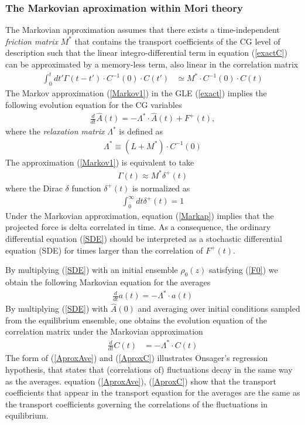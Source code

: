 \documentclass[b5paper,openright,10pt]{book}
\newcommand{\esc}{\!\cdot\!}
\begin{document}
\subsubsection{The Markovian aproximation within Mori theory}
\label{Sec:Markov}
The   Markovian   approximation   assumes    that   there   exists   a
time-independent \textit{friction matrix} $M^*$ that
  contains the transport  coefficients of the CG  level of description
such that  the linear integro-differential term  in equation (\ref{exactC})
can  be  approximated  by  a  memory-less term,  also  linear  in  the
correlation matrix
\begin{align}
\int_0^tdt' \Gamma(t-t')\esc C^{-1}(0)\esc  C(t')&\simeq M^*\esc C^{-1}(0)\esc C(t)
\label{Markov1}
\end{align}
The  Markov approximation  (\ref{Markov1})  in  the GLE  (\ref{exact})
implies the following evolution equation for the CG variables
\begin{align}
  \frac{d}{dt}\hat{A}(t) = -\Lambda^*\esc \hat{A} (t) +F^+(t),
\label{SDE}
\end{align}
where the \textit{relaxation matrix} $\Lambda^*$ is defined as
\begin{align}
\Lambda^*\equiv(L+M^*)\esc C^{-1}(0)  
\label{Lambda}
\end{align}
The   approximation
(\ref{Markov1}) is equivalent to take
\begin{align}
  \Gamma(t) \approx M^*\delta^+(t)
\label{Markap}
\end{align}
where   the Dirac $\delta$ function
$\delta^+(t)$ is normalized as
\begin{align}
  \int_0^\infty dt \delta^+(t) =1
\end{align}
Under the  Markovian approximation,  equation  (\ref{Markap})  implies that
the projected  force is delta correlated  in time. As a  consequence, the
ordinary differential equation (\ref{SDE}) should be interpreted as a
stochastic  differential  equation (SDE)  for  times  larger than  the
correlation of $F^+(t)$.

By multiplying (\ref{SDE}) with an initial ensemble $\rho_0(z)$
satisfying (\ref{F0})
we obtain the following Markovian equation for the averages
\begin{align}
  \frac{d}{dt}a(t) = -\Lambda^*\esc a(t)
\label{AproxAve}
\end{align}
By  multiplying  (\ref{SDE})  with $\hat{A}(0)$  and  averaging  over
initial conditions sampled from  the equilibrium ensemble, one obtains
the evolution  equation of the  correlation matrix  under the
Markovian   approximation
\begin{align}
    \frac{d}{dt}C(t)&=-\Lambda^*\esc  C(t)
\label{AproxC}
\end{align}
The form of (\ref{AproxAve})  and (\ref{AproxC}) illustrates Onsager's
regression hypothesis, that states that (correlations of) fluctuations
decay  in  the  same  way  as  the  averages.   equation  (\ref{AproxAve}),
(\ref{AproxC}) show that the transport coefficients that appear in the
transport  equation for  the averages  are the  same as  the transport
coefficients  governing  the  correlations   of  the  fluctuations  in
equilibrium.
\end{document}
